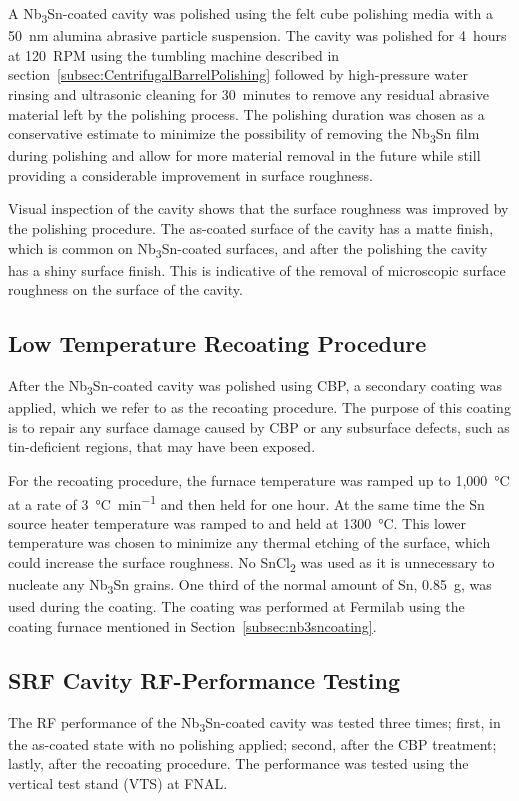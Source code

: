 \documentclass[reprint,amsmath,amssymb,aps]{revtex4-2}%
\begin{document}
A Nb\textsubscript{3}Sn-coated cavity was polished using the felt cube polishing media with a 50~nm alumina abrasive particle suspension. The cavity was polished for 4~hours at 120~RPM using the tumbling machine described in section~\ref{subsec:CentrifugalBarrelPolishing} followed by high-pressure water rinsing and ultrasonic cleaning for 30~minutes to remove any residual abrasive material left by the polishing process. The polishing duration was chosen as a conservative estimate to minimize the possibility of removing the Nb\textsubscript{3}Sn film during polishing and allow for more material removal in the future while still providing a considerable improvement in surface roughness.

Visual inspection of the cavity shows that the surface roughness was improved by the polishing procedure. The as-coated surface of the cavity has a matte finish, which is common on Nb\textsubscript{3}Sn-coated surfaces, and after the polishing the cavity has a shiny surface finish. This is indicative of the removal of microscopic surface roughness on the surface of the cavity.
%
\subsection{Low Temperature Recoating Procedure}%
\label{subsec:recoating}%
After the Nb\textsubscript{3}Sn-coated cavity was polished using CBP, a secondary coating was applied, which we refer to as the recoating procedure. The purpose of this coating is to repair any surface damage caused by CBP or any subsurface defects, such as tin-deficient regions, that may have been exposed.

For the recoating procedure, the furnace temperature was ramped up to 1,000~°C at a rate of 3~\unit{\celsius\per\minute} and then held for one hour. At the same time the Sn source heater temperature was ramped to and held at 1300~°C.
This lower temperature was chosen to minimize any thermal etching of the surface, which could increase the surface roughness. No SnCl\textsubscript{2} was used as it is unnecessary to nucleate any Nb\textsubscript{3}Sn grains. One third of the normal amount of Sn, 0.85~g, was used during the coating. The coating was performed at Fermilab using the coating furnace mentioned in Section~\ref{subsec:nb3sncoating}.

%
\subsection{SRF Cavity RF-Performance Testing}%
\label{subsec:vts}%
The RF performance of the Nb\textsubscript{3}Sn-coated cavity was tested three times; first, in the as-coated state with no polishing applied; second, after the CBP treatment; lastly, after the recoating procedure. The performance was tested using the vertical test stand (VTS) at FNAL\cite{pischalnikov2014rf}.
\end{document}

